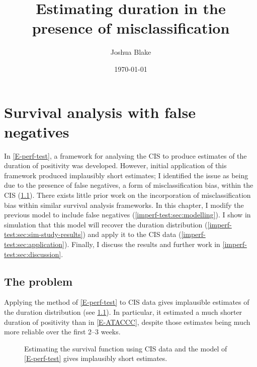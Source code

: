 \documentclass[thesis.tex]{subfiles}
\title{Estimating duration in the presence of misclassification}
\author{Joshua Blake}
\date{\today}
\begin{document}
\ifSubfilesClassLoaded{
  \setcounter{chapter}{5}
}

\chapter{Survival analysis with false negatives} \label{imperf-test}

In \cref{E-perf-test}, a framework for analysing the CIS to produce estimates of the duration of positivity was developed.
However, initial application of this framework produced implausibly short estimates; I identified the issue as being due to the presence of false negatives, a form of misclassification bias, within the CIS (\cref{imperf-test:sec:problem}).
There exists little prior work on the incorporation of misclassification bias within similar survival analysis frameworks.
In this chapter, I modify the previous model to include false negatives (\cref{imperf-test:sec:modelling}).
I show in simulation that this model will recover the duration distribution (\cref{imperf-test:sec:sim-study-results}) and apply it to the CIS data (\cref{imperf-test:sec:application}).
Finally, I discuss the results and further work in \cref{imperf-test:sec:discussion}.

\section{The problem} \label{imperf-test:sec:problem}

Applying the method of \cref{E-perf-test} to CIS data gives implausible estimates of the duration distribution (see \cref{imperf-test:fig:problem-cis-estimates}).
In particular, it estimated a much shorter duration of positivity than in \cref{E-ATACCC}, despite those estimates being much more reliable over the first 2--3 weeks.
\begin{figure}
  \centering %
  \caption[Estimating survival using CIS data assuming perfect testing]{Estimating the survival function using CIS data and the model of \cref{E-perf-test} gives implausibly short estimates. \label{imperf-test:fig:problem-cis-estimates}}
\end{figure}
\end{document}
